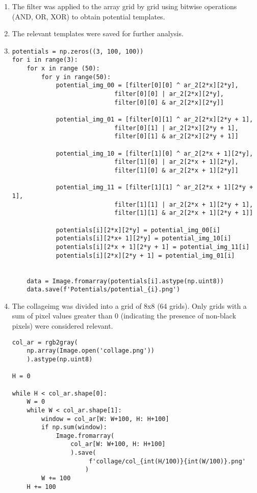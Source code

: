 \documentclass[letterpaper, 10 pt, conference]{IEEEtran}
\begin{document}
\begin{enumerate}
\item The filter was applied to the array grid by grid using bitwise operations (AND, OR, XOR) to 
obtain potential templates.

\item The relevant templates were saved for further analysis.
\item 
\begin{lstlisting}
potentials = np.zeros((3, 100, 100))
for i in range(3): 
    for x in range (50):
        for y in range(50):
            potential_img_00 = [filter[0][0] ^ ar_2[2*x][2*y], 
                            filter[0][0] | ar_2[2*x][2*y], 
                            filter[0][0] & ar_2[2*x][2*y]]

            potential_img_01 = [filter[0][1] ^ ar_2[2*x][2*y + 1], 
                            filter[0][1] | ar_2[2*x][2*y + 1],  
                            filter[0][1] & ar_2[2*x][2*y + 1]]

            potential_img_10 = [filter[1][0] ^ ar_2[2*x + 1][2*y],  
                            filter[1][0] | ar_2[2*x + 1][2*y], 
                            filter[1][0] & ar_2[2*x + 1][2*y]]

            potential_img_11 = [filter[1][1] ^ ar_2[2*x + 1][2*y + 1], 
                            filter[1][1] | ar_2[2*x + 1][2*y + 1], 
                            filter[1][1] & ar_2[2*x + 1][2*y + 1]]
            
            potentials[i][2*x][2*y] = potential_img_00[i]
            potentials[i][2*x+ 1][2*y] = potential_img_10[i]
            potentials[i][2*x + 1][2*y + 1] = potential_img_11[i]
            potentials[i][2*x][2*y + 1] = potential_img_01[i]


    data = Image.fromarray(potentials[i].astype(np.uint8))
    data.save(f'Potentials/potential_{i}.png')
\end{lstlisting}


\item The collage\textunderscore img was divided into a grid of 8x8 (64 grids). Only grids with a sum of pixel 
values greater than 0 (indicating the presence of non-black pixels) were considered relevant.

\begin{lstlisting}
col_ar = rgb2gray(
    np.array(Image.open('collage.png'))
    ).astype(np.uint8)

H = 0

while H < col_ar.shape[0]:
    W = 0
    while W < col_ar.shape[1]:
        window = col_ar[W: W+100, H: H+100]
        if np.sum(window):
            Image.fromarray(
                col_ar[W: W+100, H: H+100]
                ).save(
                     f'collage/col_{int(H/100)}{int(W/100)}.png'
                    )
        W += 100
    H += 100
\end{lstlisting}


\end{enumerate}
\end{document}
